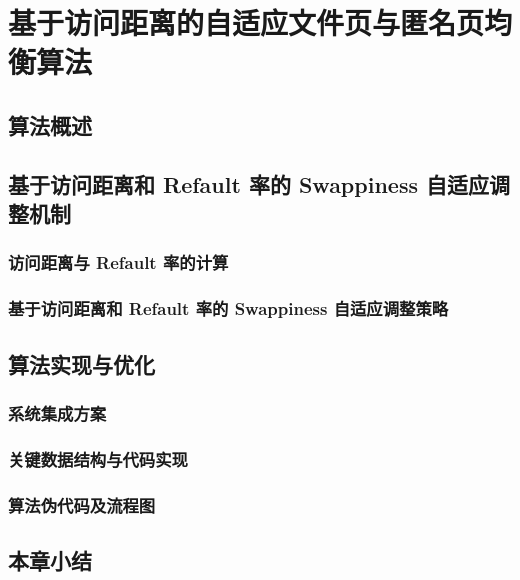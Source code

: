 \chapter{基于访问距离的自适应文件页与匿名页均衡算法} 

\section{算法概述}


\section{基于访问距离和 Refault 率的 Swappiness 自适应调整机制}

\subsection{访问距离与 Refault 率的计算} 
   

\subsection{基于访问距离和 Refault 率的 Swappiness 自适应调整策略}
  

\section{算法实现与优化}

\subsection{系统集成方案}

\subsection{关键数据结构与代码实现}

\subsection{算法伪代码及流程图} 


\section{本章小结}

